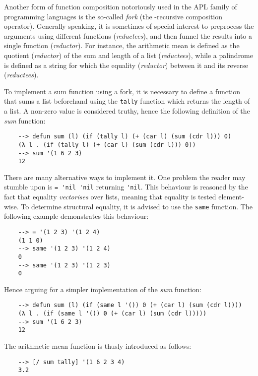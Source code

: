 Another form of function composition notoriously used in the APL family of programming languages is the so-called \textit{fork} (the \mu-recursive composition operator). Generally speaking, it is sometimes of special interest to preprocess the arguments using different functions (\textit{reductees}), and then funnel the results into a single function (\textit{reductor}). For instance, the arithmetic mean is defined as the quotient (\textit{reductor}) of the sum and length of a list (\textit{reductees}), while a palindrome is defined as a string for which the equality (\textit{reductor}) between it and its reverse (\textit{reductees}).

To implement a sum function using a fork, it is necessary to define a function that sums a list beforehand using the \verb|tally| function which returns the length of a list. A non-zero value is considered truthy, hence the following definition of the \textit{sum} function:

\begin{Verbatim}
    --> defun sum (l) (if (tally l) (+ (car l) (sum (cdr l))) 0)
    (λ l . (if (tally l) (+ (car l) (sum (cdr l))) 0))
    --> sum '(1 6 2 3)
    12
\end{Verbatim}

There are many alternative ways to implement it. One problem the reader may stumble upon is \verb|= 'nil 'nil| returning \verb|'nil|. This behaviour is reasoned by the fact that equality \textit{vectorises} over lists, meaning that equality is tested element-wise. To determine structural equality, it is advised to use the \verb|same| function. The following example demonstrates this behaviour:

\begin{Verbatim}
    --> = '(1 2 3) '(1 2 4)
    (1 1 0)
    --> same '(1 2 3) '(1 2 4)
    0
    --> same '(1 2 3) '(1 2 3)
    0
\end{Verbatim}

Hence arguing for a simpler implementation of the \textit{sum} function:
\begin{Verbatim}
    --> defun sum (l) (if (same l '()) 0 (+ (car l) (sum (cdr l))))
    (λ l . (if (same l '()) 0 (+ (car l) (sum (cdr l)))))
    --> sum '(1 6 2 3)
    12
\end{Verbatim}

The arithmetic mean function is thusly introduced as follows:

\begin{Verbatim}
    --> [/ sum tally] '(1 6 2 3 4)
    3.2
\end{Verbatim}

